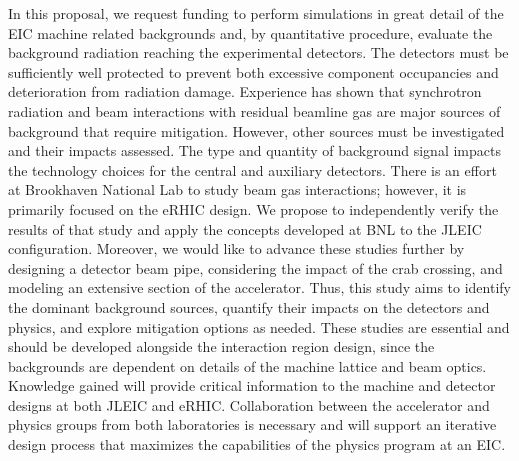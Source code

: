 In this proposal, we request funding to perform simulations in great detail of the EIC machine related backgrounds and, by quantitative procedure, evaluate the background radiation reaching the experimental detectors. The detectors must be sufficiently well protected to prevent both excessive component occupancies and deterioration from radiation damage. Experience has shown that synchrotron radiation and beam interactions with residual beamline gas are major sources of background that require mitigation. However, other sources must be investigated and their impacts assessed. The type and quantity of background signal impacts the technology choices for the central and auxiliary detectors. There is an effort at Brookhaven National Lab to study beam gas interactions; however, it is primarily focused on the eRHIC design. We propose to independently verify the results of that study and apply the concepts developed at BNL to the JLEIC configuration. Moreover, we would like to advance these studies further by designing a detector beam pipe, considering the impact of the crab crossing, and modeling an extensive section of the accelerator. Thus, this study aims to identify the dominant background sources, quantify their impacts on the detectors and physics, and explore mitigation options as needed. These studies are essential and should be developed alongside the interaction region design, since the backgrounds are dependent on details of the machine lattice and beam optics. Knowledge gained will provide critical information to the machine and detector designs at both JLEIC and eRHIC. Collaboration between the accelerator and physics groups from both laboratories is necessary and will support an iterative design process that maximizes the capabilities of the physics program at an EIC. 








